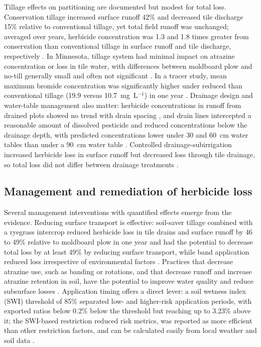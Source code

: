 \documentclass[11pt]{article}
\begin{document}
Tillage effects on partitioning are documented but modest for total loss. Conservation tillage increased surface runoff 42\% and decreased tile discharge 15\% relative to conventional tillage, yet total field runoff was unchanged; averaged over years, herbicide concentration was 1.3 and 1.8 times greater from conservation than conventional tillage in surface runoff and tile discharge, respectively \parencite{GAYNOR1995}. In Minnesota, tillage system had minimal impact on atrazine concentration or loss in tile water, with differences between moldboard plow and no-till generally small and often not significant \parencite{BUHLER1993}. In a tracer study, mean maximum bromide concentration was significantly higher under reduced than conventional tillage (19.9 versus 10.7~mg~L$^{-1}$) in one year \parencite{Fortin2002}. Drainage design and water-table management also matter: herbicide concentrations in runoff from drained plots showed no trend with drain spacing \parencite{SOUTHWICK1990}, and drain lines intercepted a reasonable amount of dissolved pesticide and reduced concentrations below the drainage depth, with predicted concentrations lower under 30 and 60~cm water tables than under a 90~cm water table \parencite{Kalita1998}. Controlled drainage-subirrigation increased herbicide loss in surface runoff but decreased loss through tile drainage, so total loss did not differ between drainage treatments \parencite{Gaynor2001}.

\subsection{Management and remediation of herbicide loss}
Several management interventions with quantified effects emerge from the evidence. Reducing surface transport is effective: soil-saver tillage combined with a ryegrass intercrop reduced herbicide loss in tile drains and surface runoff by 46 to 49\% relative to moldboard plow in one year and had the potential to decrease total loss by at least 49\% by reducing surface transport, while band application reduced loss irrespective of environmental factors \parencite{Gaynor2001}. Practices that decrease atrazine use, such as banding or rotations, and that decrease runoff and increase atrazine retention in soil, have the potential to improve water quality and reduce subsurface losses \parencite{Moorman1999}. Application timing offers a direct lever: a soil wetness index (SWI) threshold of 85\% separated low- and higher-risk application periods, with exported ratios below 0.2\% below the threshold but reaching up to 3.23\% above it; the SWI-based restriction reduced risk metrics, was reported as more efficient than other restriction factors, and can be calculated easily from local weather and soil data \parencite{Julien2023}.
\end{document}
